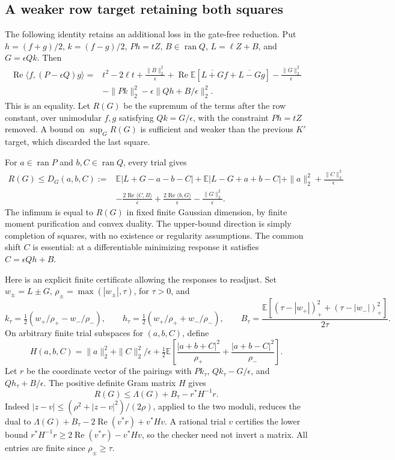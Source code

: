 \subsection{A weaker row target retaining both squares}\label{sec:weakk-rowtarget}
The following identity retains an additional loss in the gate-free reduction.
Put $h=(f+g)/2$, $k=(f-g)/2$, $Ph=tZ$, $B\in\operatorname{ran}Q$,
$L=\ell Z+B$, and $G=\epsilon Qk$. Then
\begin{align*}
\operatorname{Re}\langle f,(P-\epsilon Q)g\rangle
={}&t^2-2\ell t+\frac{\|B\|_2^2}{\epsilon}
 +\operatorname{Re}\mathbb E[\overline{L+G}f+\overline{L-G}g]
 -\frac{\|G\|_2^2}{\epsilon}\\
&-\|Pk\|_2^2-\epsilon\|Qh+B/\epsilon\|_2^2.
\end{align*}
This is an equality. Let $R(G)$ be the supremum of the terms after the row
constant, over unimodular $f,g$ satisfying $Qk=G/\epsilon$, with the constraint
$Ph=tZ$ removed. A bound on $\sup_G R(G)$ is sufficient and weaker than the
previous $K'$ target, which discarded the last square.

For $a\in\operatorname{ran}P$ and $b,C\in\operatorname{ran}Q$, every trial gives
\begin{align*}
R(G)\le D_G(a,b,C):={}&\mathbb E|L+G-a-b-C|+
\mathbb E|L-G+a+b-C|+\|a\|_2^2+\frac{\|C\|_2^2}{\epsilon}\\
&-\frac{2\operatorname{Re}\langle C,B\rangle}{\epsilon}
+\frac{2\operatorname{Re}\langle b,G\rangle}{\epsilon}
-\frac{\|G\|_2^2}{\epsilon}.
\end{align*}
The infimum is equal to $R(G)$ in fixed finite Gaussian dimension, by finite
moment purification and convex duality. The upper-bound direction is simply
completion of squares, with no existence or regularity assumptions. The
common shift $C$ is essential: at a differentiable minimizing response it
satisfies $C=\epsilon Qh+B$.

Here is an explicit finite certificate allowing the responses to readjust.
Set $w_\pm=L\pm G$, $\rho_\pm=\max(|w_\pm|,\tau)$, for $\tau>0$, and
\[
 k_\tau=\tfrac12(w_+/\rho_+-w_-/\rho_-),\qquad
 h_\tau=\tfrac12(w_+/\rho_++w_-/\rho_-),\qquad
 B_\tau=\frac{\mathbb E[(\tau-|w_+|)_+^2+(\tau-|w_-|)_+^2]}{2\tau}.
\]
On arbitrary finite trial subspaces for $(a,b,C)$, define
\[
 H(a,b,C)=\|a\|_2^2+\|C\|_2^2/\epsilon+
 \tfrac12\mathbb E\left[
 \frac{|a+b+C|^2}{\rho_+}+\frac{|a+b-C|^2}{\rho_-}\right].
\]
Let $r$ be the coordinate vector of the pairings with
$Pk_\tau$, $Qk_\tau-G/\epsilon$, and $Qh_\tau+B/\epsilon$.
The positive definite Gram matrix $H$ gives
\[
 \boxed{R(G)\le\Lambda(G)+B_\tau-r^*H^{-1}r.}
\]
Indeed $|z-v|\le(\rho^2+|z-v|^2)/(2\rho)$, applied to the two moduli,
reduces the dual to $\Lambda(G)+B_\tau-2\operatorname{Re}(v^*r)+v^*Hv$.
A rational trial $v$ certifies the lower bound
$r^*H^{-1}r\ge2\operatorname{Re}(v^*r)-v^*Hv$, so the checker need not
invert a matrix. All entries are finite since $\rho_\pm\ge\tau$.


